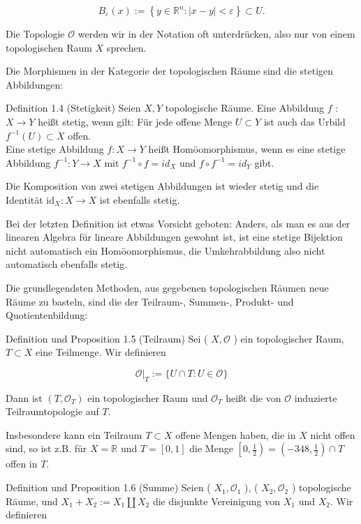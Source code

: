 \documentclass[10pt, letterpaper]{article}
\begin{document}
$$
B_{\varepsilon}(x):=\left\{y \in \mathbb{R}^{n}:|x-y|<\varepsilon\right\} \subset U .
$$

Die Topologie $\mathcal{O}$ werden wir in der Notation oft unterdrücken, also nur von einem topologischen Raum $X$ sprechen.

Die Morphismen in der Kategorie der topologischen Räume sind die stetigen Abbildungen:

Definition 1.4 (Stetigkeit) Seien $X, Y$ topologische Räume. Eine Abbildung $f$ : $X \rightarrow Y$ heißt stetig, wenn gilt: Für jede offene Menge $U \subset Y$ ist auch das Urbild $f^{-1}(U) \subset X$ offen.\\
Eine stetige Abbildung $f: X \rightarrow Y$ heißt Homöomorphismus, wenn es eine stetige Abbildung $f^{-1}: Y \rightarrow X$ mit $f^{-1} \circ f=i d_{X}$ und $f \circ f^{-1}=i d_{Y}$ gibt.

Die Komposition von zwei stetigen Abbildungen ist wieder stetig und die Identität $\mathrm{id}_{X}: X \rightarrow X$ ist ebenfalls stetig.

Bei der letzten Definition ist etwas Vorsicht geboten: Anders, als man es aus der linearen Algebra für lineare Abbildungen gewohnt ist, ist eine stetige Bijektion nicht automatisch ein Homöomorphismus, die Umkehrabbildung also nicht automatisch ebenfalls stetig.

Die grundlegendsten Methoden, aus gegebenen topologischen Räumen neue Räume zu basteln, sind die der Teilraum-, Summen-, Produkt- und Quotientenbildung:

Definition und Proposition 1.5 (Teilraum) Sei ( $X, \mathcal{O}$ ) ein topologischer Raum, $T \subset X$ eine Teilmenge. Wir definieren

$$
\left.\mathcal{O}\right|_{T}:=\{U \cap T: U \in \mathcal{O}\}
$$

Dann ist $\left(T, \mathcal{O}_{T}\right)$ ein topologischer Raum und $\mathcal{O}_{T}$ heißt die von $\mathcal{O}$ induzierte Teilraumtopologie auf $T$.

Insbesondere kann ein Teilraum $T \subset X$ offene Mengen haben, die in $X$ nicht offen sind, so ist z.B. für $X=\mathbb{R}$ und $T=[0,1]$ die Menge $\left[0, \frac{1}{2}\right)=\left(-348, \frac{1}{2}\right) \cap T$ offen in $T$.

Definition und Proposition 1.6 (Summe) Seien ( $X_{1}, \mathcal{O}_{1}$ ), ( $X_{2}, \mathcal{O}_{2}$ ) topologische Räume, und $X_{1}+X_{2}:=X_{1} \coprod X_{2}$ die disjunkte Vereinigung von $X_{1}$ und $X_{2}$. Wir definieren
\end{document}
